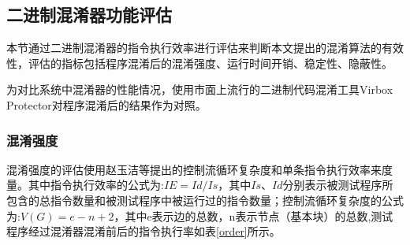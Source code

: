 \subsection{二进制混淆器功能评估}

本节通过二进制混淆器的指令执行效率进行评估来判断本文提出的混淆算法的有效性，评估的指标包括程序混淆后的混淆强度、运行时间开销、稳定性、隐蔽性。

为对比系统中混淆器的性能情况，使用市面上流行的二进制代码混淆工具Virbox Protector对程序混淆后的结果作为对照。

\subsubsection{混淆强度}

混淆强度的评估使用赵玉洁等提出的控制流循环复杂度和单条指令执行效率来度量。其中指令执行效率的公式为:$\mathit{IE = Id/Is}$，其中$\mathit{Is}$、$\mathit{Id}$分别表示被测试程序所包含的总指令数量和被测试程序中被运行过的指令数量；控制流循环复杂度的公式为:$\mathit{V(G)=e-n+2}$，其中e表示边的总数，n表示节点（基本块）的总数,测试程序经过混淆器混淆前后的指令执行率如表\ref{order}所示。

